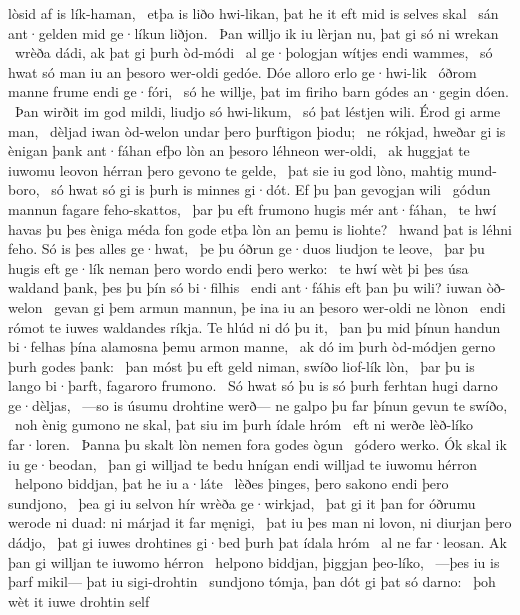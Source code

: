 lòsid af is lík-haman, \hld\ etþa is liðo hwi-likan,
þat he it eft mid is selves skal \hld\ sán ant·gelden
mid ge·líkun liðjon. \hld\ Þan willjo ik iu lèrjan nu,
þat gi só ni wrekan \hld\ wrèða dádi,
ak þat gi þurh òd-módi \hld\ al ge·þologjan
wítjes endi wammes, \hld\ só hwat só man iu an þesoro wer-oldi gedóe.
Dóe alloro erlo ge·hwi-lik \hld\ óðrom manne
frume endi ge·fóri, \hld\ só he willje, þat im firiho barn
gódes an·gegin dóen. \hld\ Þan wirðit im god mildi,
liudjo só hwi-likum, \hld\ só þat léstjen wili.
Érod gi arme man, \hld\ dèljad iwan òd-welon
undar þero þurftigon þiodu; \hld\ ne rókjad, hweðar gi is ènigan þank ant·fáhan
efþo lòn an þesoro léhneon wer-oldi, \hld\ ak huggjat te iuwomu leovon hérran
þero gevono te gelde, \hld\ þat sie iu god lòno,
mahtig mund-boro, \hld\ só hwat só gi is þurh is minnes gi·dót.
Ef þu þan gevogjan wili \hld\ gódun mannun
fagare feho-skattos, \hld\ þar þu eft frumono hugis
mér ant·fáhan, \hld\ te hwí havas þu þes èniga méda fon gode
etþa lòn an þemu is liohte? \hld\ hwand þat is léhni feho.
Só is þes alles ge·hwat, \hld\ þe þu óðrun ge·duos
liudjon te leove, \hld\ þar þu hugis eft ge·lík neman
þero wordo endi þero werko: \hld\ te hwí wèt þi þes úsa waldand þank,
þes þu þín só bi·filhis \hld\ endi ant·fáhis eft þan þu wili?
iuwan òð-welon \hld\ gevan gi þem armun mannun,
þe ina iu an þesoro wer-oldi ne lònon \hld\ endi rómot te iuwes waldandes ríkja.
Te hlúd ni dó þu it, \hld\ þan þu mid þínun handun bi·felhas
þína alamosna þemu armon manne, \hld\ ak dó im þurh òd-módjen
gerno þurh godes þank: \hld\ þan móst þu eft geld niman,
swíðo liof-lík lòn, \hld\ þar þu is lango bi·þarft,
fagaroro frumono. \hld\ Só hwat só þu is só þurh ferhtan hugi
darno ge·dèljas, \hld\ —so is úsumu drohtine werð—
ne galpo þu far þínun gevun te swíðo, \hld\ noh ènig gumono ne skal,
þat siu im þurh ídale hróm \hld\ eft ni werðe
lèð-líko far·loren. \hld\ Þanna þu skalt lòn nemen
fora godes ògun \hld\ gódero werko.
Ók skal ik iu ge·beodan, \hld\ þan gi willjad te bedu hnígan
endi willjad te iuwomu hérron \hld\ helpono biddjan,
þat he iu a·láte \hld\ lèðes þinges,
þero sakono endi þero sundjono, \hld\ þea gi iu selvon hír
wrèða ge·wirkjad, \hld\ þat gi it þan for óðrumu werode ni duad:
ni márjad it far męnigi, \hld\ þat iu þes man ni lovon,
ni diurjan þero dádjo, \hld\ þat gi iuwes drohtines gi·bed
þurh þat ídala hróm \hld\ al ne far·leosan.
Ak þan gi willjan te iuwomo hérron \hld\ helpono biddjan,
þiggjan þeo-líko, \hld\ —þes iu is þarf mikil—
þat iu sigi-drohtin \hld\ sundjono tómja,
þan dót gi þat só darno: \hld\ þoh wèt it iuwe drohtin self
